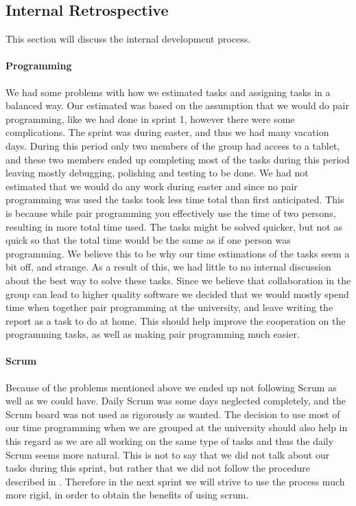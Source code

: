 \subsection{Internal Retrospective}\label{internal2}
This section will discuss the internal development process.
\paragraph{Programming}
We had some problems with how we estimated tasks and assigning tasks in a balanced way.
Our estimated was based on the assumption that we would do pair programming, like we had done in sprint 1, however there were some complications. 
The sprint was during easter, and thus we had many vacation days.
During this period only two members of the group had access to a tablet, and these two members ended up completing most of the tasks during this period leaving mostly debugging, polishing and testing to be done.
We had not estimated that we would do any work during easter and since no pair programming was used the tasks took less time total than first anticipated.
This is because while pair programming you effectively use the time of two persons, resulting in more total time used. 
The tasks might be solved quicker, but not as quick so that the total time would be the same as if one person was programming.
We believe this to be why our time estimations of the tasks seem a bit off, and strange.
As a result of this, we had little to no internal discussion about the best way to solve these tasks. 
Since we believe that collaboration in the group can lead to higher quality software we decided that we would mostly spend time when together pair programming at the university, and leave writing the report as a task to do at home. 
This should help improve the cooperation on the programming tasks, as well as making pair programming much easier.

\paragraph{Scrum}
Because of the problems mentioned above we ended up not following Scrum as well as we could have.
Daily Scrum was some days neglected completely, and the Scrum board was not used as rigorously as wanted.
The decision to use most of our time programming when we are grouped at the university should also help in this regard as we are all working on the same type of tasks and thus the daily Scrum seems more natural.
This is not to say that we did not talk about our tasks during this sprint, but rather that we did not follow the procedure described in .
Therefore in the next sprint we will strive to use the process much more rigid, in order to obtain the benefits of using scrum.